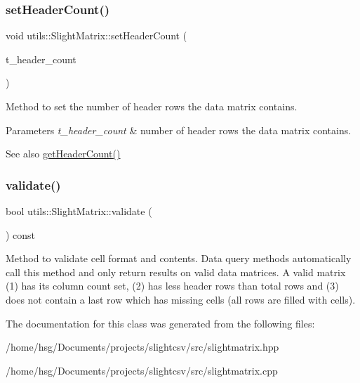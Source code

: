 \subsubsection{\texorpdfstring{set\+Header\+Count()}{setHeaderCount()}}
{\footnotesize\ttfamily void utils\+::\+Slight\+Matrix\+::set\+Header\+Count (\begin{DoxyParamCaption}\item[{const size\+\_\+t}]{t\+\_\+header\+\_\+count }\end{DoxyParamCaption})}

Method to set the number of header rows the data matrix contains. 
\begin{DoxyParams}{Parameters}
{\em t\+\_\+header\+\_\+count} & number of header rows the data matrix contains. \\
\hline
\end{DoxyParams}
\begin{DoxySeeAlso}{See also}
\hyperlink{classutils_1_1SlightMatrix_ac3ba42c47509027bd1c4a07055f347b9}{get\+Header\+Count()} 
\end{DoxySeeAlso}
\mbox{\label{classutils_1_1SlightMatrix_a536e733a179ee3eaeb5c75986cc477d3}} 
\subsubsection{\texorpdfstring{validate()}{validate()}}
{\footnotesize\ttfamily bool utils\+::\+Slight\+Matrix\+::validate (\begin{DoxyParamCaption}\item[{void}]{ }\end{DoxyParamCaption}) const}

Method to validate cell format and contents. Data query methods automatically call this method and only return results on valid data matrices. A valid matrix (1) has its column count set, (2) has less header rows than total rows and (3) does not contain a last row which has missing cells (all rows are filled with cells). 

The documentation for this class was generated from the following files\+:\begin{DoxyCompactItemize}
\item 
/home/hsg/\+Documents/projects/slightcsv/src/slightmatrix.\+hpp\item 
/home/hsg/\+Documents/projects/slightcsv/src/slightmatrix.\+cpp\end{DoxyCompactItemize}
